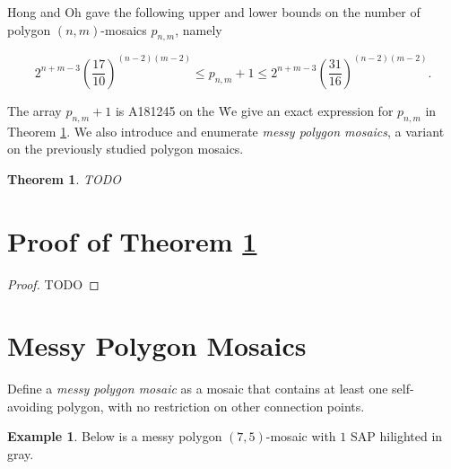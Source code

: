 \documentclass[12pt]{article}
\theoremstyle{plain}
\newtheorem{thm}{Theorem}
\theoremstyle{definition}
\theoremstyle{remark}
\theoremstyle{definition}
\newtheorem{exmp}{Example}[section]
\newcommand{\cell}[4]{ \draw[thick] ( #1 , #2 ) rectangle ( #3 , #4 );}
\newcommand{\cellA}[4]{ \draw[thick] ( #1 , #2 ) rectangle ( #3 , #4 ); \draw[red, thick] (#3 * 0.5 + #1 * 0.5 , #2) -- (#3, #4 * 0.5 + #2 * 0.5);}
\newcommand{\cellB}[4]{ \draw[thick] ( #1 , #2 ) rectangle ( #3 , #4 ); \draw[red, thick] (#3 * 0.5 + #1 * 0.5 , #2) -- (#1, #4 * 0.5 + #2 * 0.5);}
\newcommand{\cellC}[4]{ \draw[thick] ( #1 , #2 ) rectangle ( #3 , #4 ); \draw[red, thick] (#3 * 0.5 + #1 * 0.5 , #4) -- (#1, #4 * 0.5 + #2 * 0.5);}
\newcommand{\cellD}[4]{ \draw[thick] ( #1 , #2 ) rectangle ( #3 , #4 ); \draw[red, thick] (#3 * 0.5 + #1 * 0.5 , #4) -- (#3, #4 * 0.5 + #2 * 0.5);}
\newcommand{\cellE}[4]{ \draw[thick] ( #1 , #2 ) rectangle ( #3 , #4 ); \draw[red, thick] (#3 * 0.5 + #1 * 0.5 , #2) -- (#3 * 0.5 + #1 * 0.5 , #4);}
\newcommand{\cellF}[4]{ \draw[thick] ( #1 , #2 ) rectangle ( #3 , #4 ); \draw[red, thick] (#3, #4 * 0.5 + #2 * 0.5) -- (#1, #4 * 0.5 + #2 * 0.5);}
\newcommand{\cellAf}[4]{\filldraw[gray!40] ( #1 , #2 ) rectangle ( #3 , #4 ); \draw[thick] ( #1 , #2 ) rectangle ( #3 , #4 ); \draw[red, thick] (#3 * 0.5 + #1 * 0.5 , #2) -- (#3, #4 * 0.5 + #2 * 0.5);}
\newcommand{\cellBf}[4]{\filldraw[gray!40] ( #1 , #2 ) rectangle ( #3 , #4 ); \draw[thick] ( #1 , #2 ) rectangle ( #3 , #4 ); \draw[red, thick] (#3 * 0.5 + #1 * 0.5 , #2) -- (#1, #4 * 0.5 + #2 * 0.5);}
\newcommand{\cellCf}[4]{\filldraw[gray!40] ( #1 , #2 ) rectangle ( #3 , #4 ); \draw[thick] ( #1 , #2 ) rectangle ( #3 , #4 ); \draw[red, thick] (#3 * 0.5 + #1 * 0.5 , #4) -- (#1, #4 * 0.5 + #2 * 0.5);}
\newcommand{\cellDf}[4]{\filldraw[gray!40] ( #1 , #2 ) rectangle ( #3 , #4 ); \draw[thick] ( #1 , #2 ) rectangle ( #3 , #4 ); \draw[red, thick] (#3 * 0.5 + #1 * 0.5 , #4) -- (#3, #4 * 0.5 + #2 * 0.5);}
\newcommand{\cellEf}[4]{\filldraw[gray!40] ( #1 , #2 ) rectangle ( #3 , #4 ); \draw[thick] ( #1 , #2 ) rectangle ( #3 , #4 ); \draw[red, thick] (#3 * 0.5 + #1 * 0.5 , #2) -- (#3 * 0.5 + #1 * 0.5 , #4);}
\newcommand{\cellFf}[4]{\filldraw[gray!40] ( #1 , #2 ) rectangle ( #3 , #4 ); \draw[thick] ( #1 , #2 ) rectangle ( #3 , #4 ); \draw[red, thick] (#3, #4 * 0.5 + #2 * 0.5) -- (#1, #4 * 0.5 + #2 * 0.5);}
\begin{document}
Hong and Oh \cite[Hong2018]{Hong2018} gave the following upper and lower bounds on the number of polygon $(n,m)$-mosaics $p_{n,m}$, namely

$$2^{n+m-3} \left(\frac{17}{10}\right)^{(n-2)(m-2)} \leq p_{n,m} + 1 \leq 2^{n+m-3} \left(\frac{31}{16}\right)^{(n-2)(m-2)}.$$

The array $p_{n,m} + 1$ is A181245 on the \cite[OEIS]{oeis} \. We give an exact expression for $p_{n,m}$ in Theorem \ref{thm: main theorem}. We also introduce and enumerate \textit{messy polygon mosaics}, a variant on the previously studied polygon mosaics.

\begin{thm}
    \label{thm: main theorem}
    TODO
\end{thm}

\section{Proof of Theorem \ref{thm: main theorem}}

\begin{proof}
    TODO
\end{proof}

\section{Messy Polygon Mosaics}

Define a \textit{messy polygon mosaic} as a mosaic that contains at least one self-avoiding polygon, with no restriction on other connection points. 

\begin{exmp}
\label{exmp: messy sap}
Below is a messy polygon $(7,5)$-mosaic with $1$ SAP hilighted in gray. 

\begin{center}
\end{center}
\end{exmp}
\end{document}
